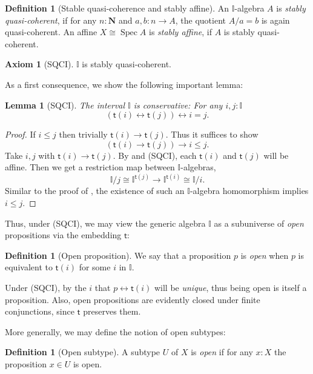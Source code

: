 \documentclass[a4paper,12pt]{amsart}
\newtheorem{lemma}[theorem]{Lemma}
\theoremstyle{definition}
\newtheorem{definition}[theorem]{Definition}
\newtheorem*{axiom}{Axiom}
\newcommand{\mb}[1]{\mathbf{#1}}
\newcommand{\mbb}[1]{\mathbb{#1}}
\newcommand{\I}{\mbb I}
\newcommand{\ms}[1]{\mathsf{#1}}
\newcommand{\N}{\mb N}
\newcommand{\eq}{\leftrightarrow}
\newcommand{\spec}{\operatorname{Spec}}
\newcommand\istsym{\ms{t}}
\newcommand\ist[1]{\istsym(#1)}
\begin{document}
\begin{definition}[Stable quasi-coherence and stably affine]
  An $\I$-algebra $A$ is \emph{stably quasi-coherent}, if for any $n : \N$ and $a,b \colon n \to A$, the quotient $A/a=b$ is again quasi-coherent. An affine $X \cong \spec A$ is \emph{stably affine}, if $A$ is stably quasi-coherent.
\end{definition}

\begin{axiom}[SQCI]\label{ax:sqci}
  $\I$ is stably quasi-coherent.
\end{axiom}

As a first consequence, we show the following important lemma:

\begin{lemma}[SQCI]\label{lem:intconserve}
  The interval $\I$ is \emph{conservative}: For any $i,j : \I$
  \[ (\ist{i} \eq \ist{j}) \eq i = j\text{.} \]
\end{lemma}
\begin{proof}
  If $i \le j$ then trivially $\ist{i} \to \ist{j}$. Thus it suffices to show
  \[ (\ist{i} \to \ist{j}) \to i \le j\text{.} \]
  Take $i,j$ with $\ist{i} \to \ist{j}$. By  and (SQCI), each $\ist{i}$ and $\ist{j}$ will be affine. Then we get a restriction map between $\I$-algebras,
  \[ \I/j \cong \I^{\ist{j}} \to \I^{\ist{i}} \cong \I/i\text{.} \]
  Similar to the proof of , the existence of such an $\I$-algebra homomorphism implies $i \le j$. 
\end{proof}

Thus, under (SQCI), we may view the generic algebra $\I$ as a subuniverse of \emph{open} propositions via the embedding $\istsym$:

\begin{definition}[Open proposition]
  We say that a proposition $p$ is \emph{open} when $p$ is equivalent to $\ist{i}$ for some $i$ in $\I$.
\end{definition}

Under (SQCI), by  the $i$ that $p \eq \ist{i}$ will be \emph{unique}, thus being open is itself a proposition. Also, open propositions are evidently closed under finite conjunctions, since $\istsym$ preserves them. 

More generally, we may define the notion of open subtypes:

\begin{definition}[Open subtype]
  A subtype $U$ of $X$ is \emph{open} if for any $x:X$ the proposition $x\in U$ is open.
\end{definition}
\end{document}

